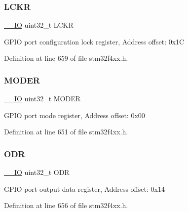 \subsubsection{\texorpdfstring{L\+C\+KR}{LCKR}}
{\footnotesize\ttfamily \hyperlink{group___c_m_s_i_s__core__definitions_gaec43007d9998a0a0e01faede4133d6be}{\+\_\+\+\_\+\+IO} uint32\+\_\+t L\+C\+KR}

G\+P\+IO port configuration lock register, Address offset\+: 0x1C 

Definition at line 659 of file stm32f4xx.\+h.

\mbox{\label{struct_g_p_i_o___type_def_a2b671a94c63a612f81e0e9de8152d01c}} 
\subsubsection{\texorpdfstring{M\+O\+D\+ER}{MODER}}
{\footnotesize\ttfamily \hyperlink{group___c_m_s_i_s__core__definitions_gaec43007d9998a0a0e01faede4133d6be}{\+\_\+\+\_\+\+IO} uint32\+\_\+t M\+O\+D\+ER}

G\+P\+IO port mode register, Address offset\+: 0x00 

Definition at line 651 of file stm32f4xx.\+h.

\mbox{\label{struct_g_p_i_o___type_def_abff7fffd2b5a718715a130006590c75c}} 
\subsubsection{\texorpdfstring{O\+DR}{ODR}}
{\footnotesize\ttfamily \hyperlink{group___c_m_s_i_s__core__definitions_gaec43007d9998a0a0e01faede4133d6be}{\+\_\+\+\_\+\+IO} uint32\+\_\+t O\+DR}

G\+P\+IO port output data register, Address offset\+: 0x14 

Definition at line 656 of file stm32f4xx.\+h.

\mbox{\label{struct_g_p_i_o___type_def_a328d16cc6213783ede54e4059ffd50a3}} 
